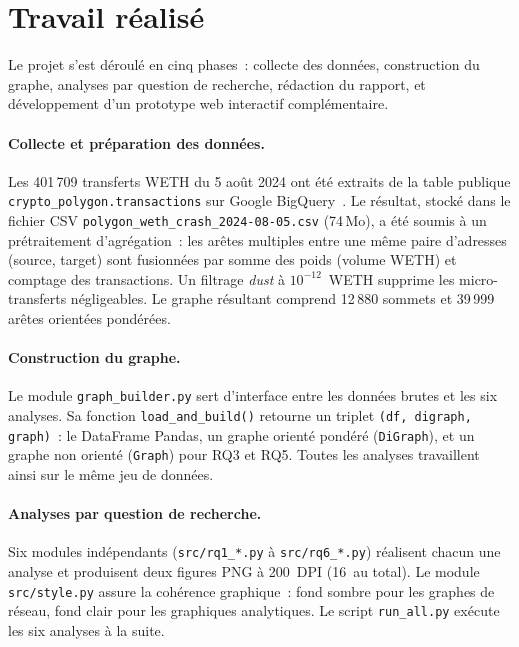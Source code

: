 
\section{Travail r\'ealis\'e}
\label{sec:travail_realise}

Le projet s'est d\'eroul\'e en cinq phases~: collecte des donn\'ees,
construction du graphe, analyses par question de recherche, r\'edaction
du rapport, et d\'eveloppement d'un prototype web interactif compl\'ementaire.

\paragraph{Collecte et pr\'eparation des donn\'ees.}
Les 401\,709 transferts WETH du 5 ao\^ut 2024 ont \'et\'e extraits de la
table publique \texttt{crypto\_polygon.transactions} sur Google
BigQuery~\cite{bigquery_public}. Le r\'esultat, stock\'e dans le fichier
CSV \texttt{polygon\_weth\_crash\_2024-08-05.csv} (74\,Mo), a \'et\'e soumis
\`a un pr\'etraitement d'agr\'egation~: les ar\^etes multiples entre une m\^eme
paire d'adresses (source, target) sont fusionn\'ees par somme des poids
(volume WETH) et comptage des transactions. Un filtrage
\textit{dust} \`a $10^{-12}$~WETH supprime les micro-transferts n\'egligeables.
Le graphe r\'esultant comprend 12\,880 sommets et 39\,999 ar\^etes orient\'ees
pond\'er\'ees.

\paragraph{Construction du graphe.}
Le module \texttt{graph\_builder.py} sert d'interface entre les donn\'ees
brutes et les six analyses. Sa fonction \texttt{load\_and\_build()} retourne
un triplet \texttt{(df, digraph, graph)}~: le DataFrame Pandas, un graphe
orient\'e pond\'er\'e (\texttt{DiGraph}), et un graphe non orient\'e
(\texttt{Graph}) pour RQ3 et RQ5. Toutes les analyses travaillent ainsi sur
le m\^eme jeu de donn\'ees.

\paragraph{Analyses par question de recherche.}
Six modules ind\'ependants (\texttt{src/rq1\_*.py} \`a \texttt{src/rq6\_*.py})
r\'ealisent chacun une analyse et produisent deux figures PNG \`a 200~DPI
(16~au total). Le module \texttt{src/style.py} assure la coh\'erence
graphique~: fond sombre pour les graphes de r\'eseau, fond clair pour les
graphiques analytiques. Le script \texttt{run\_all.py} ex\'ecute les six
analyses \`a la suite.

